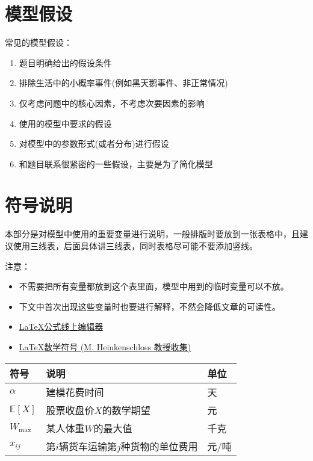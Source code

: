 \documentclass[12pt,utf8]{article}
\begin{document}
\section{模型假设}

常见的模型假设：
\begin{enumerate}
\item 题目明确给出的假设条件
\item 排除生活中的小概率事件(例如黑天鹅事件、非正常情况)
\item 仅考虑问题中的核心因素，不考虑次要因素的影响
\item 使用的模型中要求的假设
\item 对模型中的参数形式(或者分布)进行假设
\item 和题目联系很紧密的一些假设，主要是为了简化模型
\end{enumerate}

\section{符号说明}

本部分是对模型中使用的重要变量进行说明，一般排版时要放到一张表格中，且建议使用三线表，后面具体讲三线表，同时表格尽可能不要添加竖线。

注意：
\begin{itemize}
\item 不需要把所有变量都放到这个表里面，模型中用到的临时变量可以不放。
\item 下文中首次出现这些变量时也要进行解释，不然会降低文章的可读性。
\item \href{https://www.latexlive.com/}{\LaTeX 公式线上编辑器}
\item \href{https://www.caam.rice.edu/~heinken/latex/symbols.pdf}{\LaTeX 数学符号 (M. Heinkenschloss 教授收集) }
\end{itemize}

\begin{table}[h]
\centering
\begin{tabular}{p{2cm}<{\centering}p{9cm}<{\centering}p{2cm}<{\centering}}
   \toprule
   符号 & 说明 & 单位 \\
   \midrule
   $\alpha$ & 建模花费时间  & 天   \\
   $\mathbb{E}[X]$ & 股票收盘价$X$的数学期望 & 元 \\
   $W_{\text{max}}$ & 某人体重$W$的最大值 & 千克  \\
   $x_{ij}$ & 第$i$辆货车运输第$j$种货物的单位费用&  元/吨 \\
   \bottomrule
\end{tabular}
\end{table}
\end{document}
